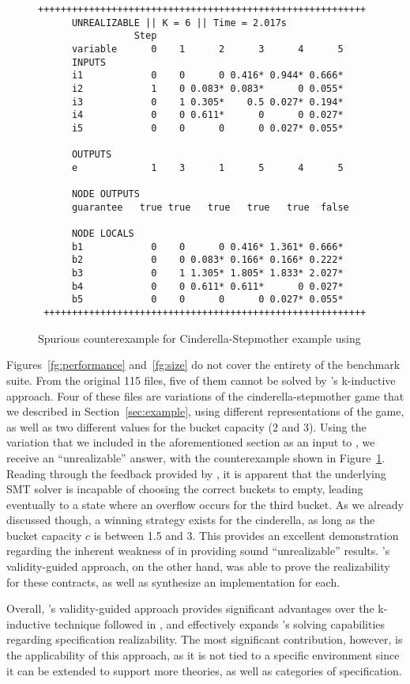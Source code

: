 \begin{figure}[h]
\centering
 \begin{Verbatim}[fontsize=\scriptsize]
 ++++++++++++++++++++++++++++++++++++++++++++++++++++++++++
      UNREALIZABLE || K = 6 || Time = 2.017s
                 Step
      variable      0    1      2      3      4      5
      INPUTS
      i1            0    0      0 0.416* 0.944* 0.666*
      i2            1    0 0.083* 0.083*      0 0.055*
      i3            0    1 0.305*    0.5 0.027* 0.194*
      i4            0    0 0.611*      0      0 0.027*
      i5            0    0      0      0 0.027* 0.055*
 
      OUTPUTS
      e             1    3      1      5      4      5
 
      NODE OUTPUTS
      guarantee   true true   true   true   true  false
 
      NODE LOCALS
      b1            0    0      0 0.416* 1.361* 0.666*
      b2            0    0 0.083* 0.166* 0.166* 0.222*
      b3            0    1 1.305* 1.805* 1.833* 2.027*
      b4            0    0 0.611* 0.611*      0 0.027*
      b5            0    0      0      0 0.027* 0.055*
 +++++++++++++++++++++++++++++++++++++++++++++++++++++++++
 \end{Verbatim}
\caption{Spurious counterexample for Cinderella-Stepmother example using \jsyn}

\label{fg:cex}
\end{figure}

Figures~\ref{fg:performance} and~\ref{fg:size} do not cover the entirety of the
benchmark suite. From the original 115 files, five of them cannot be
solved by \jsyn's k-inductive approach. Four of these files are variations of
the cinderella-stepmother game that we described in Section~\ref{sec:example},
using different representations of the game, as well as two different values
for the bucket capacity (2 and 3). Using the variation that we included in the
aforementioned section as an input to \jsyn, we receive an ``unrealizable'' answer, with the counterexample shown
in Figure~\ref{fg:cex}. Reading through the feedback provided by \jsyn, it is
apparent that the underlying SMT solver is incapable of choosing the correct
buckets to empty, leading eventually to a state where an overflow occurs for the
third bucket. As we already discussed though, a winning strategy exists for the
cinderella, as long as the bucket capacity $c$ is between 1.5 and 3. This
provides an excellent demonstration regarding the inherent weakness of \jsyn
in providing sound ``unrealizable'' results. \jsynvg's validity-guided approach,
on the other hand, was able to prove the realizability for these contracts, as
well as synthesize an implementation for each.

Overall, \jsynvg's validity-guided approach provides significant advantages
over the k-inductive technique followed in \jsyn, and effectively expands
\jkind's solving capabilities regarding specification realizability. The most
significant contribution, however, is the applicability of this approach, as it
is not tied to a specific environment since it can be extended to support more
theories, as well as categories of specification.
